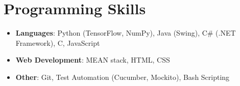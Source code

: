 \documentclass[letterpaper,11pt]{article}
\newcommand{\resumeItem}[2]{
  \item\small{
    \textbf{#1}{: #2 \vspace{-2pt}}
  }
}
\newcommand{\resumeSubHeadingListStart}{\begin{itemize}[leftmargin=*]}
\newcommand{\resumeSubHeadingListEnd}{\end{itemize}}
\newcommand{\resumeItemListStart}{\begin{itemize}}
\newcommand{\resumeItemListEnd}{\end{itemize}\vspace{-5pt}}
\begin{document}
\section{Programming Skills}
  \resumeSubHeadingListStart
    \item
      \textbf{Languages}{: Python (TensorFlow, NumPy), Java (Swing), C\# (.NET Framework), C, JavaScript } 
    \item 
      \textbf{Web Development}{: MEAN stack, HTML, CSS }
    \item \textbf{Other}{: Git, Test Automation (Cucumber, Mockito), Bash Scripting}
  \resumeSubHeadingListEnd 
\end{document}
